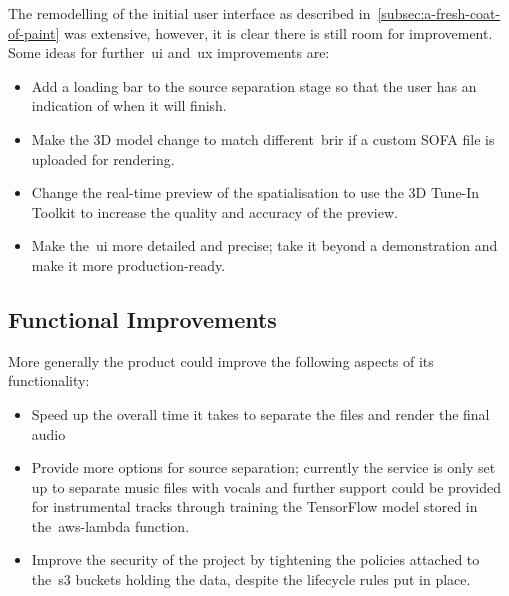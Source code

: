 The remodelling of the initial user interface as described in~\ref{subsec:a-fresh-coat-of-paint} was extensive,
however, it is clear there is still room for improvement.
Some ideas for further~\gls{ui} and~\gls{ux} improvements are:
\begin{itemize}
    \item Add a loading bar to the source separation stage so that the user has an indication of when it will finish.
    \item Make the 3D model change to match different~\gls{brir} if a custom SOFA file is uploaded for rendering.
    \item Change the real-time preview of the spatialisation to use the 3D Tune-In Toolkit to increase the quality and accuracy of the preview.
    \item Make the~\gls{ui} more detailed and precise; take it beyond a demonstration and make it more production-ready.
\end{itemize}

\subsection{Functional Improvements}\label{subsec:functional-improvements}

More generally the product could improve the following aspects of its functionality:

\begin{itemize}
    \item Speed up the overall time it takes to separate the files and render the final audio
    \item Provide more options for source separation; currently the service is only set up to separate music files with vocals and further support could be provided for instrumental tracks through training the TensorFlow model stored in the~\gls{aws-lambda} function.
    \item Improve the security of the project by tightening the policies attached to the~\gls{s3} buckets holding the data, despite the lifecycle rules put in place.
\end{itemize}